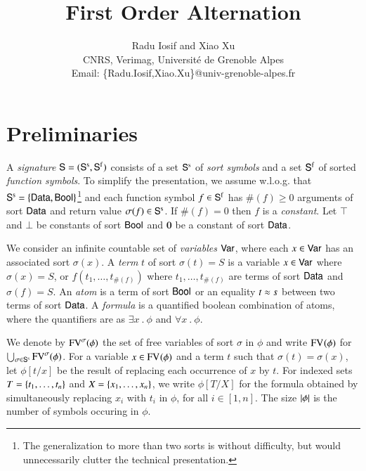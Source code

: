 \documentclass{llncs}
\begin{document}

\title{First Order Alternation}

\author{Radu Iosif and Xiao Xu \\
CNRS, Verimag, Universit\'e de Grenoble Alpes \\
Email: \{Radu.Iosif,Xiao.Xu\}@univ-grenoble-alpes.fr}

\maketitle

\begin{abstract}
\end{abstract}

\section{Preliminaries}

A \emph{signature} $\mathsf{S} = (\mathsf{S}^\mathrm{s},\mathsf{S}^\mathrm{f})$ consists of a
set $\mathsf{S}^\mathrm{s}$ of \emph{sort symbols} and a set $\mathsf{S}^\mathrm{f}$ of
sorted \emph{function symbols}. To simplify the presentation, we
assume w.l.o.g. that $\mathsf{S}^\mathrm{s} = \left\{ \mathsf{Data},\mathsf{Bool} \right\}$\footnote{The
  generalization to more than two sorts is without difficulty, but
  would unnecessarily clutter the technical presentation.} and each
function symbol $f \in \mathsf{S}^\mathrm{f}$ has $\#(f) \geq 0$ arguments of
sort $\mathsf{Data}$ and return value $\sigma(f) \in \mathsf{S}^\mathrm{s}$. If
$\#(f)=0$ then $f$ is a \emph{constant}. Let $\top$ and $\bot$ be
constants of sort $\mathsf{Bool}$ and $\mathbf{0}$ be a constant of sort
$\mathsf{Data}$.

We consider an infinite countable set of \emph{variables} $\mathsf{Var}$,
where each $x \in \mathsf{Var}$ has an associated sort $\sigma(x)$. A
\emph{term} $t$ of sort $\sigma(t)=S$ is a variable $x \in \mathsf{Var}$
where $\sigma(x)=S$, or $f(t_1,\ldots,t_{\#(f)})$ where
$t_1,\ldots,t_{\#(f)}$ are terms of sort $\mathsf{Data}$ and $\sigma(f)=S$. An
\emph{atom} is a term of sort $\mathsf{Bool}$ or an equality $t \approx s$
between two terms of sort $\mathsf{Data}$. A \emph{formula} is a quantified
boolean combination of atoms, where the quantifiers are as $\exists x
~.~ \phi$ and $\forall x ~.~ \phi$.

We denote by $\mathrm{FV}^{\sigma}(\phi)$ the set of free variables of sort
$\sigma$ in $\phi$ and write $\mathrm{FV}^{}(\phi)$ for $\bigcup_{\sigma \in
  \mathsf{S}^\mathrm{s}} \mathrm{FV}^{\sigma}(\phi)$. For a variable $x \in
\mathrm{FV}^{}(\phi)$ and a term $t$ such that $\sigma(t) = \sigma(x)$, let
$\phi[t/x]$ be the result of replacing each occurrence of $x$ by
$t$. For indexed sets $T=\left\{ t_1,\ldots,t_n \right\}$ and
$X=\left\{ x_1,\ldots,x_n \right\}$, we write $\phi[T/X]$ for
the formula obtained by simultaneously replacing $x_i$ with $t_i$ in
$\phi$, for all $i\in[1,n]$. The size ${|{\phi}|}$ is the number of
symbols occuring in $\phi$.
\end{document}
